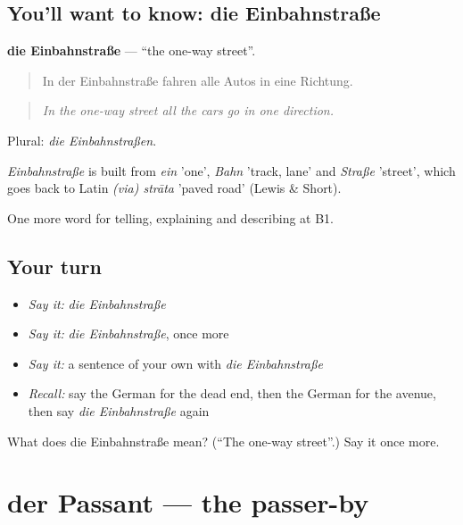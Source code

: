 \subsection*{You'll want to know: die Einbahnstraße}
\textbf{die Einbahnstraße} — \textquotedblleft{}the one-way street\textquotedblright{}.

\begin{quote}
In der Einbahnstraße fahren alle Autos in eine Richtung.
\end{quote}

\begin{quote}
\emph{In the one-way street all the cars go in one direction.}
\end{quote}

Plural: \emph{die Einbahnstraßen}.

\begin{cousinweb}
\emph{Einbahnstraße} is built from \emph{ein} 'one', \emph{Bahn} 'track, lane' and \emph{Straße} 'street', which goes back to Latin \emph{(via) strāta} 'paved road' (Lewis \& Short).
\end{cousinweb}

\begin{grammarlens}[title={What you've built}]
One more word for telling, explaining and describing at B1.
\end{grammarlens}

\subsection*{Your turn}
\begin{itemize}
\raggedright
  \item \emph{Say it:} \emph{die Einbahnstraße}
  \item \emph{Say it:} \emph{die Einbahnstraße}, once more
  \item \emph{Say it:} a sentence of your own with \emph{die Einbahnstraße}
  \item \emph{Recall:} say the German for the dead end, then the German for the avenue, then say \emph{die Einbahnstraße} again
\end{itemize}

\begin{tcolorbox}[breakable,colback=teal!4,colframe=teal!35!black,title={Before you move on}]
What does die Einbahnstraße mean? (\textquotedblleft{}The one-way street\textquotedblright{}.) Say it once more.
\end{tcolorbox}
\section[der Passant]{der Passant — the passer-by}

